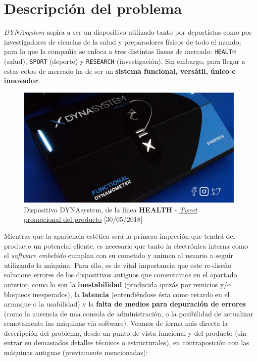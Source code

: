\chapter{Descripción del problema}

\textit{DYNAsystem} aspira a ser un dispositivo utilizado tanto por deportistas como por investigadores de ciencias de la salud y preparadores físicos de todo el mundo; para lo que la compañía se enfoca a tres distintas líneas de mercado: \texttt{HEALTH} (salud), \texttt{SPORT} (deporte) y \texttt{RESEARCH} (investigación). Sin embargo, para llegar a estas cotas de mercado ha de ser un \textbf{sistema funcional, versátil, único e innovador}.\\

\begin{figure}[H]
	\centering
	\includegraphics[width=0.7\linewidth]{imagenes/dynasystem-blue-floor.jpeg}
	\caption{Dispositivo DYNAsystem, de la línea \textbf{HEALTH} - \href{https://twitter.com/dynasystem_/status/1001762762111021057}{\textit{Tweet} promocional del producto} [30/05/2018]}
	\label{dynasystem-health}
\end{figure}

Mientras que la apariencia estética será la primera impresión que tendrá del producto un potencial cliente, es necesario que tanto la electrónica interna como el \textit{software embebido} cumplan con su cometido y animen al usuario a seguir utilizando la máquina. Para ello, es de vital importancia que este re-diseño solucione errores de los dispositivos antiguos que comentamos en el apartado anterior, como lo son la \textbf{inestabilidad} (producida quizás por reinicios y/o bloqueos inesperados), la \textbf{latencia} (entendiéndose ésta como retardo en el arranque o la usabilidad) y la \textbf{falta de medios para depuración de errores} (como la ausencia de una consola de administración, o la posibilidad de actualizar remotamente las máquinas vía software). Veamos de forma más directa la descripción del problema, desde un punto de vista funcional y del producto (sin entrar en demasiados detalles técnicos o estructurales), en contraposición con las máquinas antiguas (previamente mencionadas):

